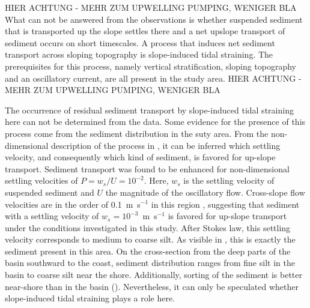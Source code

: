 HIER ACHTUNG - MEHR ZUM UPWELLING PUMPING, WENIGER BLA
What can not be answered from the observations is whether suspended sediment 
that is transported up the slope settles there and a net upslope transport of 
sediment occurs on short timescales. A process that induces net sediment 
transport across sloping 
topography is slope-induced tidal straining. The prerequisites for this 
process, namely vertical stratification, sloping topography and an oscillatory 
current, are all present in the study area. 
HIER ACHTUNG - MEHR ZUM UPWELLING PUMPING, WENIGER BLA

The occurrence of residual sediment transport by slope-induced tidal straining 
here can not be determined from the data. Some evidence for the presence of 
this process come from the sediment distribution in the suty area. From the 
non-dimensional description of the process in \cite{schulzumlauf2016}, 
it can be inferred which settling velocity, and consequently which kind of 
sediment, is favored for up-slope transport. Sediment transport was found 
to be enhanced for non-dimensional settling velocities of $P= w_s \slash U = 
10^{-2}$. Here, $w_s$ is the settling velocity of suspended sediment and $U$ 
the magnitude of the oscillatory flow. Cross-slope flow velocities are in the 
order of 0.1~m~s$^{-1}$ in this region \citep[][data from this 
study]{lass1993}, suggesting that sediment with a settling velocity of 
$w_s=10^{-3}$~m~s$^{-1}$ is favored for up-slope transport under the conditions 
investigated in this study. After Stokes law, this settling velocity 
corresponds to medium to coarse silt. As visible in , this is 
exactly the sediment present in this area. On the cross-section from the deep 
parts of the basin southward to the coast, sediment distribution ranges from 
fine silt in the basin to coarse silt near the shore. Additionally, sorting of 
the sediment is better near-shore than in the basin (). 
Nevertheless, it can only be speculated whether slope-induced tidal straining 
plays a role here.


